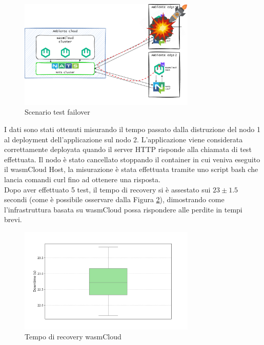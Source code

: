\FloatBarrier
\begin{figure}[ht!]
    \centering
    \includegraphics[width=0.75\textwidth]{img/schemi/schemi-test-failover-good.drawio.pdf}
    \caption{Scenario test failover}
    \label{fig:test_recovery}
\end{figure}
\FloatBarrier

I dati sono stati ottenuti misurando il tempo passato dalla distruzione del nodo 1 al deployment dell'applicazione sul nodo 2. L'applicazione viene considerata correttamente deployata quando il server HTTP risponde alla chiamata di test effettuata. Il nodo è stato cancellato stoppando il container in cui veniva eseguito il wasmCloud Host, la misurazione è stata effettuata tramite uno script bash che lancia comandi curl fino ad ottenere una risposta.\\
Dopo aver effettuato 5 test, il tempo di recovery si è assestato sui \(23 \pm 1.5\) secondi (come è possibile osservare dalla Figura \ref{fig:test_recovery_plot}), dimostrando come l'infrastruttura basata su wasmCloud possa rispondere alle perdite in tempi brevi.

\FloatBarrier
\begin{figure}[ht!]
    \centering
    \includegraphics[width=0.75\textwidth]{img/plots/boxplot_failover.png}
    \caption{Tempo di recovery wasmCloud}
    \label{fig:test_recovery_plot}
\end{figure}
\FloatBarrier